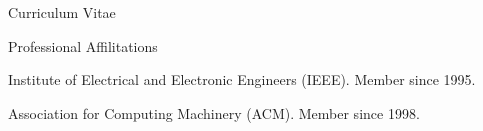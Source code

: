 \documentclass{article}
\begin{document}
\begin{cv}{Curriculum Vitae}
    \begin{cvlist}{Professional Affilitations}
    \item Institute of Electrical and Electronic Engineers (IEEE).
      Member since 1995.
    \item Association for Computing Machinery (ACM).  Member since 1998.
    \end{cvlist}

  \end{cv}
\end{document}

